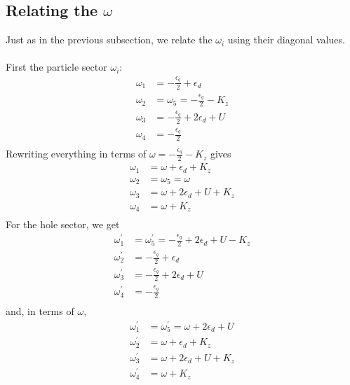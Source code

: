 \documentclass[twoside,11pt]{report}
\numberwithin{equation}{section}
\begin{document}
\subsection{Relating the \(\omega\)}
Just as in the previous subsection, we relate the \(\omega_i\) using their diagonal values.
\\\\First the particle sector \(\omega_i\):
\begin{equation}\begin{aligned}
	\omega_1 &= -\frac{\epsilon_q}{2} + \epsilon_d\\
	\omega_2 &= \omega_5 = -\frac{\epsilon_q}{2} - K_z\\
	\omega_3 &= -\frac{\epsilon_q}{2} + 2\epsilon_d + U\\
	\omega_4 &= -\frac{\epsilon_q}{2}\\
\end{aligned}\end{equation}
Rewriting everything in terms of \(\omega = -\frac{\epsilon_q}{2} - K_z\) gives
\begin{equation}\begin{aligned}
	\omega_1 &= \omega + \epsilon_d + K_z\\
	\omega_2 &= \omega_5 = \omega\\
	\omega_3 &= \omega + 2\epsilon_d + U + K_z\\
	\omega_4 &= \omega + K_z\\
\end{aligned}\end{equation}
For the hole sector, we get
\begin{equation}\begin{aligned}
	\omega^\prime_1 &= \omega_5^\prime = -\frac{\epsilon_q}{2} + 2\epsilon_d + U - K_z\\
	\omega^\prime_2 &= -\frac{\epsilon_q}{2} + \epsilon_d\\
	\omega_3^\prime &= -\frac{\epsilon_q}{2} + 2\epsilon_d + U\\
	\omega^\prime_4 &= -\frac{\epsilon_q}{2}\\
\end{aligned}\end{equation}
and, in terms of \(\omega\),
\begin{equation}\begin{aligned}
	\omega^\prime_1 &= \omega_5^\prime = \omega + 2\epsilon_d + U\\
	\omega^\prime_2 &= \omega + \epsilon_d + K_z\\
	\omega_3^\prime &= \omega + 2\epsilon_d + U + K_z\\
	\omega^\prime_4 &= \omega + K_z\\
\end{aligned}\end{equation}
\end{document}
